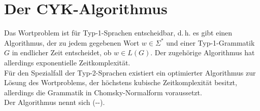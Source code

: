 \pagebreak

\section{%
    Der CYK-Algorithmus%
}

\begin{Bem}
    Das Wortproblem ist für Typ-1-Sprachen entscheidbar, d.\,h.
    es gibt einen Algorithmus, der zu jedem gegebenen Wort $w \in \Sigma^\ast$
    und einer Typ-1-Grammatik $G$ in endlicher Zeit entscheidet, ob
    $w \in L(G)$.
    Der zugehörige Algorithmus hat allerdings exponentielle Zeitkomplexität.\\
    Für den Spezialfall der Typ-2-Sprachen existiert ein optimierter
    Algorithmus zur Lösung des Wortproblems, der höchstens kubische
    Zeitkomplexität besitzt, allerdings die Grammatik in Chomsky-Normalform
    voraussetzt.\\
    Der Algorithmus nennt sich 
    (--).
\end{Bem}

\linie

